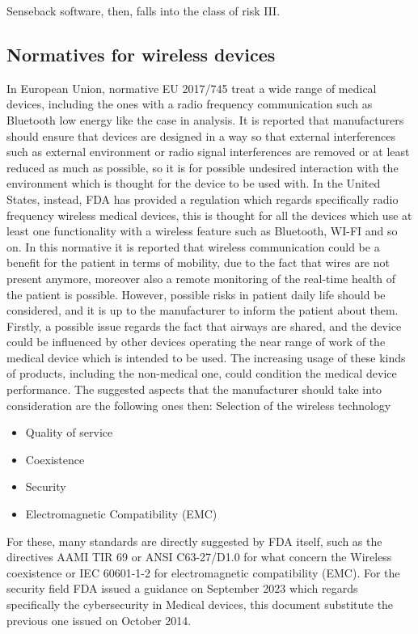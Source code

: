 \documentclass{Configuration_Files/PoliMi3i_thesis}
\begin{document}
Senseback software, then, falls into the class of risk III. 

\subsection{Normatives for wireless devices}

In European Union, normative EU 2017/745 \cite{RegolamentoUE20172017} treat a wide range of medical devices, including the ones with a radio frequency communication such as Bluetooth low energy like the case in analysis. It is reported that manufacturers should ensure that devices are designed in a way so that external interferences such as external environment or radio signal interferences are removed or at least reduced as much as possible, so it is for possible undesired interaction with the environment which is thought for the device to be used with. 
In the United States, instead, FDA has provided a regulation \cite{healthWirelessMedicalDevices2023} which regards specifically radio frequency wireless medical devices, this is thought for all the devices which use at least one functionality with a wireless feature such as Bluetooth, WI-FI and so on. 
In this normative it is reported that wireless communication could be a benefit for the patient in terms of mobility, due to the fact that wires are not present anymore, moreover also a remote monitoring of the real-time health of the patient is possible. However, possible risks in patient daily life should be considered, and it is up to the manufacturer to inform the patient about them. Firstly, a possible issue regards the fact that airways are shared, and the device could be influenced by other devices operating the near range of work of the medical device which is intended to be used. The increasing usage of these kinds of products, including the non-medical one, could condition the medical device performance. The suggested aspects that the manufacturer should take into consideration are the following ones then:
Selection of the wireless technology 
\begin{itemize}

	\item Quality of service
	\item  Coexistence
	\item  Security
	\item  Electromagnetic Compatibility (EMC)

\end{itemize}
For these, many standards are directly suggested by FDA itself, such as the directives AAMI TIR 69 \cite{RecognizedConsensusStandards} or ANSI C63-27/D1.0 \cite{IEEEANSIC63} for what concern the Wireless coexistence or IEC 60601-1-2 \cite{IEC60601122014} for electromagnetic compatibility (EMC).
For the security field FDA issued a guidance \cite{healthCybersecurityMedicalDevices2023} on September 2023 which regards specifically the cybersecurity in Medical devices, this document substitute the previous one \cite{ContentPremarketSubmissions} issued on October 2014.
\end{document}
